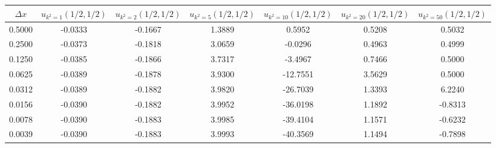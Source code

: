 \begin{tabular}{|c|c|c|c|c|c|c|}
\hline
\textbf{$\Delta x$}&\textbf{$u_{k^2=1}(1/2, 1/2)$}&\textbf{$u_{k^2=2}(1/2, 1/2)$}&\textbf{$u_{k^2=5}(1/2, 1/2)$}&\textbf{$u_{k^2=10}(1/2, 1/2)$}&\textbf{$u_{k^2=20}(1/2, 1/2)$}&\textbf{$u_{k^2=50}(1/2, 1/2)$}\\\hline
0.5000&-0.0333&-0.1667&1.3889&0.5952&0.5208&0.5032\\\hline
0.2500&-0.0373&-0.1818&3.0659&-0.0296&0.4963&0.4999\\\hline
0.1250&-0.0385&-0.1866&3.7317&-3.4967&0.7466&0.5000\\\hline
0.0625&-0.0389&-0.1878&3.9300&-12.7551&3.5629&0.5000\\\hline
0.0312&-0.0389&-0.1882&3.9820&-26.7039&1.3393&6.2240\\\hline
0.0156&-0.0390&-0.1882&3.9952&-36.0198&1.1892&-0.8313\\\hline
0.0078&-0.0390&-0.1883&3.9985&-39.4104&1.1571&-0.6232\\\hline
0.0039&-0.0390&-0.1883&3.9993&-40.3569&1.1494&-0.7898\\\hline
\end{tabular}
